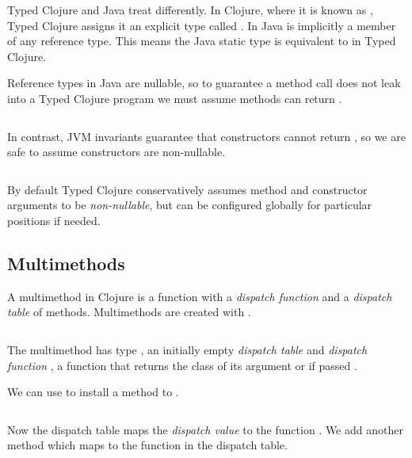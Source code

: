 Typed Clojure and Java treat  differently.
In Clojure, where it is known as , Typed Clojure assigns it an explicit type
called . In Java  is implicitly a member of any reference type.
This means the Java static type  is equivalent to
 in Typed Clojure.

Reference types in Java are nullable, so to guarantee a method call does not
leak  into a Typed Clojure program we
must assume methods can return .

\begin{exmp}
\inputminted[firstline=6,lastline=8]{clojure}{code/demo/src/demo/parent3.clj}
\end{exmp}

In contrast, JVM invariants guarantee that  constructors cannot return ,
so we are safe to assume constructors are non-nullable.

\begin{exmp}
\inputminted[firstline=15,lastline=16]{clojure}{code/demo/src/demo/parent3.clj}
\end{exmp}

By default Typed Clojure conservatively assumes method and constructor arguments to be \emph{non-nullable},
but can be configured globally for particular positions if needed.

\subsection{Multimethods}

\label{sec:multioverview}

A multimethod in Clojure is a function with a \emph{dispatch
function} and a \emph{dispatch table} of methods. Multimethods are created with {}.
\inputminted[firstline=5,lastline=6]{clojure}{code/demo/src/demo/rep.clj}
The multimethod  has type , an initially empty \emph{dispatch table}
and \emph{dispatch function} , a function that
returns the class of its argument or  if passed .

We can use {} to install a method to .
\inputminted[firstline=7,lastline=7]{clojure}{code/demo/src/demo/rep.clj}
Now the dispatch table maps
the \emph{dispatch value}  to the function
. 
We add another method
which maps
 to the function
in the dispatch table.
\inputminted[firstline=8,lastline=8]{clojure}{code/demo/src/demo/rep.clj}

